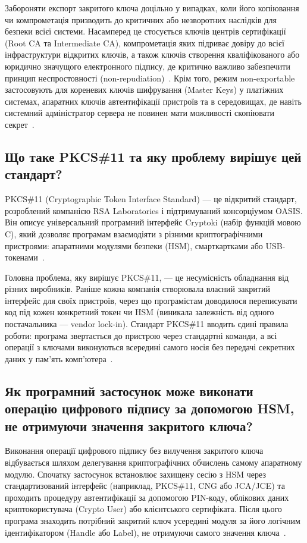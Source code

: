 Забороняти експорт закритого ключа доцільно у випадках, коли його копіювання чи компрометація
призводить до критичних або незворотних наслідків для безпеки всієї системи. Насамперед це стосується
ключів центрів сертифікації (Root CA та Intermediate CA), компрометація яких підриває довіру до всієї
інфраструктури відкритих ключів, а також ключів створення кваліфікованого або юридично значущого
електронного підпису, де критично важливо забезпечити принцип неспростовності
(non-repudiation)~\cite{nist57}. Крім того, режим non-exportable застосовують для кореневих
ключів шифрування (Master Keys) у платіжних системах, апаратних ключів автентифікації пристроїв та в
середовищах, де навіть системний адміністратор сервера не повинен мати можливості скопіювати
секрет~\cite{owaspkey}.

\subsection{Що таке PKCS\#11 та яку проблему вирішує цей стандарт?}

PKCS\#11 (Cryptographic Token Interface Standard) --- це відкритий стандарт, розроблений компанією RSA
Laboratories і підтримуваний консорціумом OASIS. Він описує універсальний програмний інтерфейс Cryptoki
(набір функцій мовою C), який дозволяє програмам взаємодіяти з різними криптографічними пристроями:
апаратними модулями безпеки (HSM), смарткартками або USB-токенами~\cite{pkcs11}.

Головна проблема, яку вирішує PKCS\#11, --- це несумісність обладнання від різних виробників. Раніше кожна
компанія створювала власний закритий інтерфейс для своїх пристроїв, через що програмістам доводилося
переписувати код під кожен конкретний токен чи HSM (виникала залежність від одного постачальника ---
vendor lock-in). Стандарт PKCS\#11 вводить єдині правила роботи: програма звертається до пристрою через
стандартні команди, а всі операції з ключами виконуються всередині самого носія без передачі секретних
даних у пам'ять комп'ютера~\cite{pkcs11}.

\subsection{Як програмний застосунок може виконати операцію цифрового підпису за допомогою HSM, не отримуючи значення закритого ключа?}

Виконання операції цифрового підпису без вилучення закритого ключа відбувається шляхом делегування
криптографічних обчислень самому апаратному модулю. Спочатку застосунок встановлює захищену сесію з
HSM через стандартизований інтерфейс (наприклад, PKCS\#11, CNG або JCA/JCE) та проходить процедуру
автентифікації за допомогою PIN-коду, облікових даних криптокористувача (Crypto User) або
клієнтського сертифіката. Після цього програма знаходить потрібний закритий ключ усередині модуля за його
логічним ідентифікатором (Handle або Label), не отримуючи самого значення ключа~\cite{pkcs11, awshsm}.

